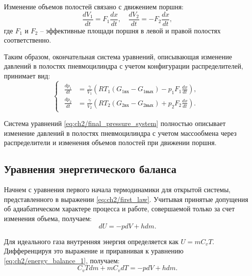 Изменение объемов полостей связано с движением поршня:
\begin{equation}
\label{eq:ch2/volume_change}
    \frac{dV_1}{dt} = F_1\frac{dx}{dt}, \quad \frac{dV_2}{dt} = -F_2\frac{dx}{dt},
\end{equation}
где $F_1$ и $F_2$ -- эффективные площади поршня в левой и правой полостях соответственно.

Таким образом, окончательная система уравнений, описывающая изменение
давлений в полостях пневмоцилиндра с учетом конфигурации распределителей, принимает вид:
\begin{equation}
\label{eq:ch2/final_pressure_system}
    \begin{cases}
        \begin{aligned}
            \frac{dp_1}{dt} & = \frac{\gamma}{V_1}\left(RT_1(G_{1\text{вх}} - G_{1\text{вых}}) - p_1 F_1\frac{dx}{dt}\right), \\
            \frac{dp_2}{dt} & = \frac{\gamma}{V_2}\left(RT_2(G_{2\text{вх}} - G_{2\text{вых}}) + p_2 F_2\frac{dx}{dt}\right).
        \end{aligned}
    \end{cases}
\end{equation}

Система уравнений \eqref{eq:ch2/final_pressure_system} полностью описывает
изменение давлений в полостях пневмоцилиндра с учетом массообмена через
распределители и изменения объемов полостей при движении поршня.

\subsection{Уравнения энергетического баланса}\label{sec:ch2/sec2/subsec3}

Начнем с уравнения первого начала термодинамики для открытой системы, представленного в выражении \eqref{eq:ch2/first_law}. Учитывая принятые допущения об адиабатическом характере процесса и работе, совершаемой только за счет изменения объема, получаем:
\begin{equation}
\label{eq:ch2/energy_balance_1}
    dU = -pdV + hdm.
\end{equation}

Для идеального газа внутренняя энергия определяется как $U = mC_vT$. Дифференцируя это выражение и приравнивая к уравнению \eqref{eq:ch2/energy_balance_1}, получаем:
\begin{equation}
\label{eq:ch2/energy_balance_2}
    C_vTdm + mC_vdT = -pdV + hdm.
\end{equation}


